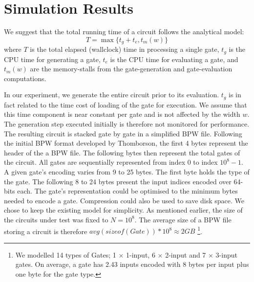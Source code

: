 \section{Simulation Results}
We suggest that the total running time of a circuit follows the analytical model:
\begin{equation}
T = \max\{ t_g + t_e, t_m(w) \}
\end{equation}
where $T$ is the total elapsed (wallclock) time in processing a single gate, $t_g$ is the CPU time for generating a gate, $t_e$ is the CPU time for evaluating a gate, and $t_m(w)$ are the memory-stalls from the gate-generation and gate-evaluation computations.
\par
In our experiment, we generate the entire circuit prior to its evaluation. $t_g$ is in fact related to the time cost of loading of the gate for execution. We assume that this time component is near constant per gate and is not affected by the width $w$. The generation step executed initially is therefore not monitored for performance. The resulting circuit is stacked gate by gate in a simplified BPW file. Following the initial BPW format developed by Thomborson, the first 4 bytes represent the header of the a BPW file\cite{clark}. The following bytes then represent the total gates of the circuit. All gates are sequentially represented from index $0$ to index $10^8-1$. A given gate's encoding varies from 9 to 25 bytes. The first byte holds the type of the gate. The following 8 to 24 bytes present the input indices encoded over 64-bits each. The gate's representation could be optimised to the minimum bytes needed to encode a gate. Compression could also be used to save disk space. We chose to keep the existing model for simplicity. As mentioned earlier, the size of the circuits under test was fixed to $N = 10^8$. The average size of a BPW file storing a circuit is therefore $avg(sizeof(Gate)) * 10^8 \approx 2 GB$ \footnote{We modelled 14 types of Gates; 1 $\times$ 1-input, 6 $\times$ 2-input and 7 $\times$ 3-input gates. On average, a gate has 2.43 inputs encoded with 8 bytes per input plus one byte for the gate type.}.

